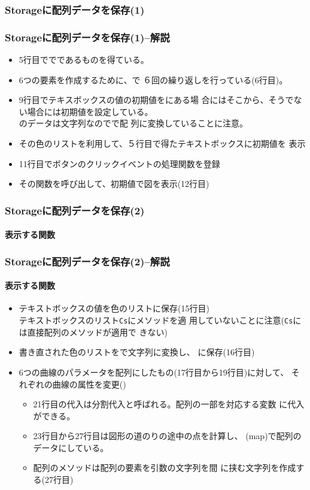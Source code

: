 \begin{frame}[containsverbatim]
 \frametitle{Storageに配列データを保存(1)}
\end{frame}
\begin{frame}[containsverbatim]
 \frametitle{Storageに配列データを保存(1)--解説}
 \begin{itemize}
	\item 5行目ででであるものを得ている。
	\item 6つの要素を作成するために、で
				６回の繰り返しを行っている(6行目)。
	\item 9行目でテキスボックスの値の初期値をにある場
				合にはそこから、そうでない場合には初期値を設定している。\\
				のデータは文字列なのでで配
				列に変換していることに注意。
	\item その色のリストを利用して、５行目で得たテキストボックスに初期値を
				表示
	\item 11行目でボタンのクリックイベントの処理関数を登録
	\item その関数を呼び出して、初期値で図を表示(12行目)
 \end{itemize}
\end{frame}
\begin{frame}[containsverbatim]
 \frametitle{Storageに配列データを保存(2)}
 \framesubtitle{表示する関数}
\end{frame}
\begin{frame}[containsverbatim]
 \frametitle{Storageに配列データを保存(2)--解説}
 \framesubtitle{表示する関数}
\begin{itemize}
 \item テキストボックスの値を色のリストに保存(15行目)\\
			 テキストボックスのリスト\texttt{Cs}にメソッドを適
			 用していないことに注意(\texttt{Cs}には直接配列のメソッドが適用で
			 きない)
 \item 書き直された色のリストをで文字列に変換し、
			 に保存(16行目)
 \item 6つの曲線のパラメータを配列にしたもの(17行目から19行目)に対して、
			 それぞれの曲線の属性を変更()
			 \begin{itemize}
				\item 21行目の代入は分割代入と呼ばれる。配列の一部を対応する変数
							に代入ができる。
				\item 23行目から27行目は図形の道のりの途中の点を計算し、
							\JSKey(map)で配列のデータにしている。
				\item 配列のメソッドは配列の要素を引数の文字列を間
							に挟む文字列を作成する(27行目)
			 \end{itemize}
\end{itemize}
\end{frame}

